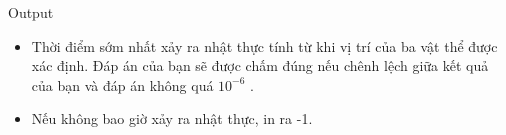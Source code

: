 Output
\begin{itemize}
	\item     Thời điểm sớm nhất xảy ra nhật thực tính từ khi vị trí của ba vật thể được xác định. Đáp án của bạn sẽ được chấm đúng nếu chênh lệch giữa kết quả của bạn và đáp án không quá $10^{-6}$    .   
	\item     Nếu không bao giờ xảy ra nhật thực, in ra -1.   
\end{itemize}